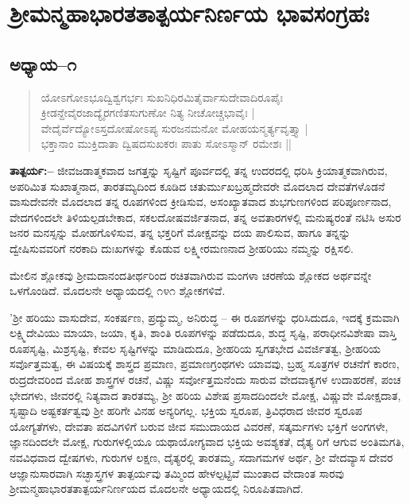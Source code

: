 

\begin{center}
\end{center}

\begin{center}
\end{center}

\chapter{ ಶ‍್ರೀಮನ್ಮಹಾಭಾರತತಾತ್ಪರ್ಯನಿರ್ಣಯ ಭಾವಸಂಗ್ರಹಃ}

\section{ಅಧ್ಯಾಯ–೧}

\begin{verse}
ಯೋಽಗೋಽಭೂದ್ವಿಶ್ವಗರ್ಭಃ ಸುಖನಿಧಿರಮಿತೈರ್ವಾಸುದೇವಾದಿರೂಪೈಃ \\ ಕ್ರೀಡನ್ದೇವೈರಜಾದ್ಯೈರಗಣಿತಸುಗುಣೋ ನಿತ್ಯ ನೀಚೋಚ್ಚಭಾವೈಃ | \\ ವೇದೈರ್ವೆದ್ಯೋಽಸ್ತದೋಷೋಽಪ್ಯ ಸುರಜನಮನೋ ಮೋಹಯನ್ಮರ್ತ್ಯವೃತ್ತ್ಯಾ | \\ಭಕ್ತಾನಾಂ ಮುಕ್ತಿದಾತಾ ದ್ವಿಷದಸುಖಕರಃ ಪಾತು ಸೋಽಸ್ಮಾನ್ ರಮೇಶಃ ||
\end{verse}

\textbf{ತಾತ್ಪರ್ಯ:– }ಜೀವಜಡಾತ್ಮಕವಾದ ಜಗತ್ತನ್ನು ಸೃಷ್ಟಿಗೆ ಪೂರ್ವದಲ್ಲಿ ತನ್ನ ಉದರದಲ್ಲಿ ಧರಿಸಿ ಕ್ರಿಯಾತ್ಮಕವಾಗಿರುವ, ಅಪರಿಮಿತ ಸುಖಾತ್ಮನಾದ, ತಾರತಮ್ಯದಿಂದ ಕೂಡಿದ ಚತುರ್ಮುಖಬ್ರಹ್ಮದೇವರೇ ಮೊದಲಾದ ದೇವತೆಗಳೊಡನೆ ವಾಸುದೇವನೇ ಮೊದಲಾದ ತನ್ನ ರೂಪಗಳಿಂದ ಕ್ರೀಡಿಸುವ, ಅಸಂಖ್ಯಾತವಾದ ಶುಭಗುಣಗಳಿಂದ ಪರಿಪೂರ್ಣನಾದ, ವೇದಗಳಿಂದಲೇ ತಿಳಿಯಲ್ಪಡಬೇಕಾದ, ಸಕಲದೋಷವರ್ಜಿತನಾದ, ತನ್ನ ಅವತಾರಗಳಲ್ಲಿ ಮನುಷ್ಯರಂತೆ ನಟಿಸಿ ಅಸುರ ಜನರ ಮನಸ್ಸನ್ನು ಮೋಹಗೊಳಿಸುವ, ತನ್ನ ಭಕ್ತರಿಗೆ ಮೋಕ್ಷವನ್ನು ದಯ ಪಾಲಿಸುವ, ಹಾಗೂ ತನ್ನನ್ನು ದ್ವೇಷಿಸುವವರಿಗೆ ನರಕಾದಿ ದುಃಖಗಳನ್ನು ಕೊಡುವ ಲಕ್ಷ್ಮೀರಮಣನಾದ ಶ‍್ರೀಹರಿಯು ನಮ್ಮನ್ನು ರಕ್ಷಿಸಲಿ.

ಮೇಲಿನ ಶ್ಲೋಕವು ಶ‍್ರೀಮದಾನಂದತೀರ್ಥರಿಂದ ರಚಿತವಾಗಿರುವ ಮಂಗಳಾ ಚರಣೆಯ ಶ್ಲೋಕದ ಅರ್ಥವನ್ನೇ ಒಳಗೊಂಡಿದೆ. ಮೊದಲನೇ ಅಧ್ಯಾಯದಲ್ಲಿ ೧೪೧ ಶ್ಲೋಕಗಳಿವೆ.

'ಶ‍್ರೀ ಹರಿಯು ವಾಸುದೇವ, ಸಂಕರ್ಷಣ, ಪ್ರದ್ಯುಮ್ಮ, ಅನಿರುದ್ಧ – ಈ ರೂಪಗಳನ್ನು ಧರಿಸಿದುದೂ, ಇದಕ್ಕೆ ಕ್ರಮವಾಗಿ ಲಕ್ಷ್ಮಿದೇವಿಯು ಮಾಯಾ, ಜಯಾ, ಕೃತಿ, ಶಾಂತಿ ರೂಪಗಳನ್ನು ಪಡೆದುದೂ, ಶುದ್ಧ ಸೃಷ್ಟಿ, ಪರಾಧೀನವಿಶೇಷಾ ವಾಸ್ತಿ ರೂಪಸೃಷ್ಟಿ, ಮಿಶ್ರಸೃಷ್ಟಿ, ಕೇವಲ ಸೃಷ್ಟಿಗಳನ್ನು ಮಾಡಿದುದೂ, ಶ‍್ರೀಹರಿಯ ಸ್ವಗತಭೇದ ವಿವರ್ಜಿತತ್ವ, ಶ‍್ರೀಹರಿಯ ಸರ್ವೊತ್ತಮತ್ವ, ಈ ವಿಷಯಕ್ಕೆ ಶಾಸ್ತ್ರದ ಪ್ರಮಾಣ, ಪ್ರಮಾಣಗ್ರಂಥಗಳು ಯಾವವು, ಬ್ರಹ್ಮ ಸೂತ್ರಗಳ ರಚನೆಗೆ ಕಾರಣ, ರುದ್ರದೇವರಿಂದ ಮೋಹ ಶಾಸ್ತ್ರಗಳ ರಚನೆ, ವಿಷ್ಣು ಸರ್ವೋತ್ತಮನೆಂದು ಸಾರುವ ವೇದವಾಕ್ಯಗಳ ಉದಾಹರಣೆ, ಪಂಚ ಭೇದಗಳು, ಜೀವರಲ್ಲಿ ನಿತ್ಯವಾದ ತಾರತಮ್ಯ, ಶ‍್ರೀ ಹರಿಯ ವಿಶೇಷ ಪ್ರಸಾದದಿಂದಲೇ ಮೋಕ್ಷ, ವಿಷ್ಣುವೇ ಮೋಕ್ಷದಾತ, ಸೃಷ್ಟಾದಿ ಅಷ್ಟಕರ್ತತ್ವವು ಶ‍್ರೀ ಹರಿಗೇ ವಿನಹ ಅನ್ಯರಿಗಲ್ಲ. ಭಕ್ತಿಯ ಸ್ವರೂಪ, ತ್ರಿವಿಧರಾದ ಜೀವರ ಸ್ವರೂಪ ಯೋಗ್ಯತೆಗಳು, ದೇವತಾ ಪದವಿಗಳಿಗೆ ಬರುವ ಜೀವ ಸಮುದಾಯದ ವಿವರಣೆ, ಸತ್ಕರ್ಮಗಳು ಭಕ್ತಿಗೆ ಅಂಗಗಳೇ, ಜ್ಞಾನದಿಂದಲೇ ಮೋಕ್ಷ, ಗುರುಗಳಲ್ಲಿಯೂ ಯಥಾಯೋಗ್ಯವಾದ ಭಕ್ತಿಯ ಅವಶ್ಯಕತೆ, ದೈತ್ಯ ರಿಗೆ ಆಗುವ ಅಂತಿಮಗತಿ, ನವವಿಧವಾದ ದ್ವೇಷಗಳು, ಗುರುಗಳ ಲಕ್ಷಣ, ದೈತ್ಯರಲ್ಲಿ ತಾರತಮ್ಮ, ಸದಾಗಮಗಳ ಅರ್ಥ, ಶ‍್ರೀ ವೇದವ್ಯಾಸ ದೇವರ ಆಜ್ಞಾನುಸಾರವಾಗಿ ಸಚ್ಛಾಸ್ತ್ರಗಳ ತಾತ್ಪರ್ಯವು ತಮ್ಮಿಂದ ಹೇಳಲ್ಪಟ್ಟಿವೆ ಮುಂತಾದ ವೇದಾಂತ ಸಾರವು ಶ‍್ರೀಮನ್ಮಹಾಭಾರತತಾತ್ಪರ್ಯನಿರ್ಣಯದ ಮೊದಲನೇ ಅಧ್ಯಾಯದಲ್ಲಿ ನಿರೂಪಿತವಾಗಿದೆ.


